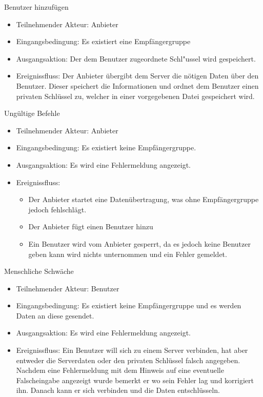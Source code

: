 \documentclass[a4paper,10pt]{scrartcl}
\begin{document}
\begin{usecase}

 {Benutzer hinzufügen
   \begin{itemize}
   \item Teilnehmender Akteur: Anbieter
   \item Eingangsbedingung: Es existiert eine Empfängergruppe
   \item Ausgangsaktion: Der dem Benutzer zugeordnete Schl"ussel wird gespeichert.
   \item Ereignissfluss: Der Anbieter übergibt dem Server die nötigen Daten über den Benutzer.
         Dieser speichert die Informationen und ordnet dem Benutzer einen privaten Schlüssel
         zu, welcher in einer vorgegebenen Datei gespeichert wird.
   \end{itemize}
}

 {Ungültige Befehle
   \begin{itemize}
   \item Teilnehmender Akteur: Anbieter
   \item Eingangsbedingung: Es existiert keine Empfängergruppe.
   \item Ausgangsaktion: Es wird eine Fehlermeldung angezeigt.
   \item Ereignissfluss:
          \begin{itemize}
           \item Der Anbieter startet eine Datenübertragung, was ohne Empfängergruppe jedoch fehlschlägt.
           \item Der Anbieter fügt einen Benutzer hinzu
           \item Ein Benutzer wird vom Anbieter gesperrt, da es jedoch keine Benutzer geben kann wird nichts unternommen
                    und ein Fehler gemeldet.
           \end{itemize}
   \end{itemize}
}
 {Menschliche Schwäche
   \begin{itemize}
   \item Teilnehmender Akteur: Benutzer
   \item Eingangsbedingung: Es existiert keine Empfängergruppe und es werden Daten an diese gesendet.
   \item Ausgangsaktion: Es wird eine Fehlermeldung angezeigt.
   \item Ereignissfluss: Ein Benutzer will sich zu einem Server verbinden, hat aber entweder die Serverdaten oder den privaten Schlüssel falsch angegeben.
             Nachdem eine Fehlermeldung mit dem Hinweis auf eine eventuelle Falscheingabe angezeigt wurde bemerkt er wo sein Fehler lag und korrigiert ihn.
            Danach kann er sich verbinden und die Daten entschlüsseln.
   \end{itemize}
}
\end{usecase}
\end{document}
